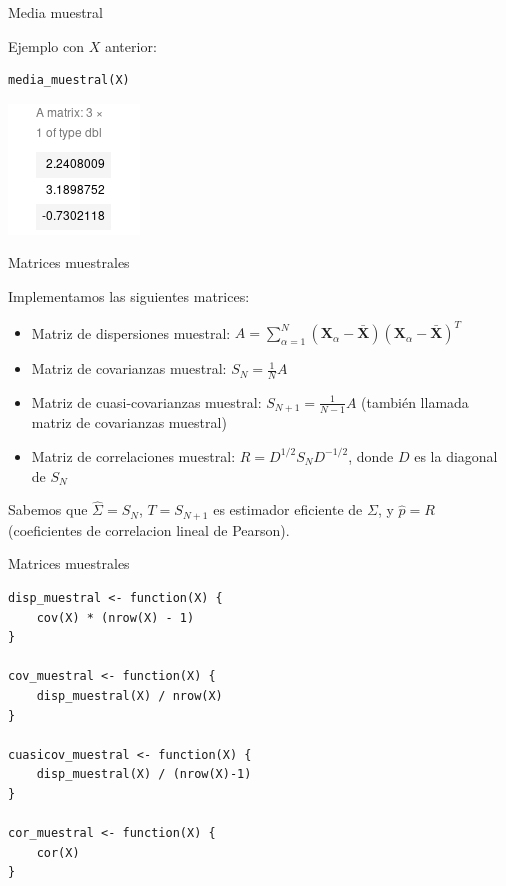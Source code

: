 \documentclass[xcolor=table]{beamer}
\begin{document}
\begin{frame}[fragile]{Media muestral}

Ejemplo con $X$ anterior:

\begin{lstlisting}
media_muestral(X)
\end{lstlisting}

\begin{center}
\includegraphics[scale=0.7]{media_muestral.png}
\end{center}


\end{frame}

\begin{frame}[fragile]{Matrices muestrales}

Implementamos las siguientes matrices:

\begin{itemize}

\item Matriz de dispersiones muestral: $A = \sum^N_{\alpha = 1} (\pmb{X}_\alpha - \pmb{\bar{X}})(\pmb{X}_\alpha - \pmb{\bar{X}})^T$
\item Matriz de covarianzas muestral: $S_N = \frac{1}{N} A$
\item Matriz de cuasi-covarianzas muestral: $S_{N+1} = \frac{1}{N-1} A $ (también llamada matriz de covarianzas muestral)
\item Matriz de correlaciones muestral: $R = D^{1/2}S_N D^{-1/2}$, donde $D$ es la diagonal de $S_N$

\end{itemize}

Sabemos que $\hat{\Sigma} = S_N$, $T = S_{N+1}$ es estimador eficiente de $\Sigma$, y $\hat{p} = R$ (coeficientes de correlacion lineal de Pearson).

\end{frame}


\begin{frame}[fragile]{Matrices muestrales}

\begin{lstlisting}
disp_muestral <- function(X) {
    cov(X) * (nrow(X) - 1)
}

cov_muestral <- function(X) {
    disp_muestral(X) / nrow(X)
}

cuasicov_muestral <- function(X) {
    disp_muestral(X) / (nrow(X)-1)
}

cor_muestral <- function(X) {
    cor(X)
}
\end{lstlisting}

\end{frame}
\end{document}
